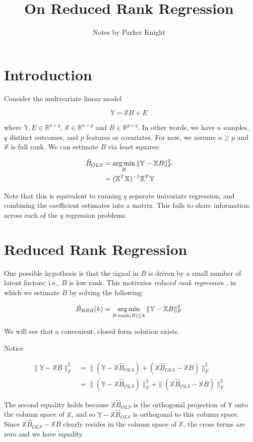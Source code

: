 \documentclass{article}
\title{On Reduced Rank Regression}
\author{Notes by Parker Knight}
\newcommand{\rank}{\textrm{rank}}
\newcommand{\R}{\mathbb{R}}
\newcommand{\X}{\mathbb{X}}
\newcommand{\Y}{\mathbb{Y}}
\newcommand{\argmin}{\mathop{\rm arg\,min}}
\begin{document}
\maketitle

\section{Introduction}

Consider the multivariate linear model

$$\Y = \X B + E$$

where $\Y,E \in \R^{n \times q}$, $\X \in \R^{n \times p}$ and $B \in \R^{p
\times q}$. In other words, we have $n$ samples, $q$ distinct outcomes, and $p$
features or covariates. For now, we assume $n \geq p$ and $\X$ is full rank. We
can estimate $B$ via least squares:

\begin{align*}
	\hat{B}_{OLS} &= \argmin_{B}\|\Y - \X B \|_F^2 \\
	&= (\X^T\X)^{-1}\X^T\Y
\end{align*}

Note that this is equivalent to running $q$ separate univariate regression, and
combining the coefficient estimates into a matrix. This fails to share
information across each of the $q$ regression problems. 

\section{Reduced Rank Regression}

One possible hypothesis is that
the signal in $B$ is driven by a small number of latent factors; i.e., $B$ is
low rank. This motivates \textit{reduced rank regression} \cite{izenman_reduced-rank_1975}, in which we estimate
$B$ by solving the following:

$$\hat{B}_{RRR}(k) = \argmin_{B: \rank(B) \leq k}\|\Y - \X B \|_F^2$$

We will see that a convenient, closed form solution exists.

Notice

\begin{align*}
	\|\Y - \X B \|_F^2 &= \| (\Y - \X \hat{B}_{OLS}) + (\X \hat{B}_{OLS} - \X B) \|_F^2 \\
	&= \| (\Y - \X \hat{B}_{OLS})\|_F^2 + \| (\X \hat{B}_{OLS} - \X B) \|_F^2
\end{align*}

The second equality holds because $\X \hat{B}_{OLS}$ is the orthogonal
projection of $\Y$ onto the column space of $\X$, and so $\Y - \X \hat{B}_{OLS}$
is orthogonal to this column space. Since $\X \hat{B}_{OLS} - \X
B$ clearly resides in the column space of $\X$, the cross terms are zero and we
have equality.
\end{document}
